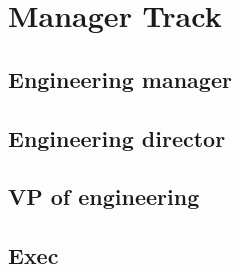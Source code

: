\documentclass[a4paper, french, openany, 12pt]{book}
\begin{document}
\part{Manager Track}

\chapter{Engineering manager}

\chapter{Engineering director}

\chapter{VP of engineering}

\chapter{Exec}

\backmatter

\tableofcontents
\end{document}
